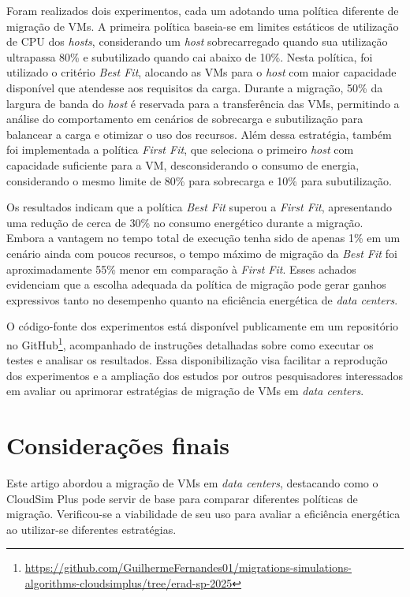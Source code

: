 \documentclass[12pt]{article}
\begin{document}
Foram realizados dois experimentos, cada um adotando uma política diferente de migração de VMs. A primeira política baseia-se em limites estáticos de utilização de CPU dos \textit{hosts}, considerando um \textit{host} sobrecarregado quando sua utilização ultrapassa 80\% e subutilizado quando cai abaixo de 10\%. Nesta política, foi utilizado o critério \textit{Best Fit}, alocando as VMs para o \textit{host} com maior capacidade disponível que atendesse aos requisitos da carga. Durante a migração, 50\% da largura de banda do \textit{host} é reservada para a transferência das VMs, permitindo a análise do comportamento em cenários de sobrecarga e subutilização para balancear a carga e otimizar o uso dos recursos. Além dessa estratégia, também foi implementada a política \textit{First Fit}, que seleciona o primeiro \textit{host} com capacidade suficiente para a VM, desconsiderando o consumo de energia, considerando o mesmo limite de 80\% para sobrecarga e 10\% para subutilização.

Os resultados indicam que a política \textit{Best Fit} superou a \textit{First Fit}, apresentando uma redução de cerca de 30\% no consumo energético durante a migração. Embora a vantagem no tempo total de execução tenha sido de apenas 1\% em um cenário ainda com poucos recursos, o tempo máximo de migração da \textit{Best Fit} foi aproximadamente 55\% menor em comparação à \textit{First Fit}. Esses achados evidenciam que a escolha adequada da política de migração pode gerar ganhos expressivos tanto no desempenho quanto na eficiência energética de \textit{data centers}.

O código-fonte dos experimentos está disponível publicamente em um repositório no GitHub\footnote{\url{https://github.com/GuilhermeFernandes01/migrations-simulations-algorithms-cloudsimplus/tree/erad-sp-2025}}, acompanhado de instruções detalhadas sobre como executar os testes e analisar os resultados. Essa disponibilização visa facilitar a reprodução dos experimentos e a ampliação dos estudos por outros pesquisadores interessados em avaliar ou aprimorar estratégias de migração de VMs em \textit{data centers}.

\section{Considerações finais}

Este artigo abordou a migração de VMs em \textit{data centers}, destacando como o CloudSim Plus pode servir de base para comparar diferentes políticas de migração. Verificou-se a viabilidade de seu uso para avaliar a eficiência energética ao utilizar-se diferentes estratégias.
\end{document}
